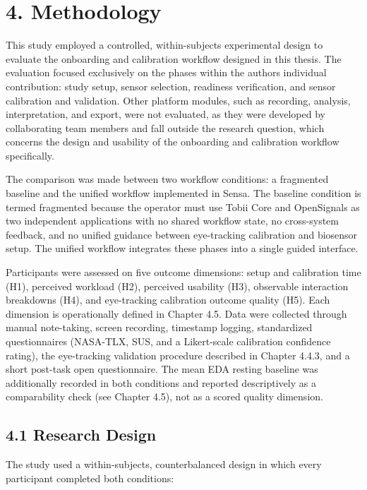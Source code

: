 \documentclass[
]{article}
\begin{document}
\clearpage
\hypertarget{methodology}{%
\section{4. Methodology}\label{methodology}}

This study employed a controlled, within-subjects experimental design to evaluate the onboarding and calibration workflow designed in this thesis. The evaluation focused exclusively on the phases within the author\textquotesingle s individual contribution: study setup, sensor selection, readiness verification, and sensor calibration and validation. Other platform modules, such as recording, analysis, interpretation, and export, were not evaluated, as they were developed by collaborating team members and fall outside the research question, which concerns the design and usability of the onboarding and calibration workflow specifically.

The comparison was made between two workflow conditions: a fragmented baseline and the unified workflow implemented in Sensa. The baseline condition is termed fragmented because the operator must use Tobii Core and OpenSignals as two independent applications with no shared workflow state, no cross-system feedback, and no unified guidance between eye-tracking calibration and biosensor setup. The unified workflow integrates these phases into a single guided interface.

Participants were assessed on five outcome dimensions: setup and calibration time (H1), perceived workload (H2), perceived usability (H3), observable interaction breakdowns (H4), and eye-tracking calibration outcome quality (H5). Each dimension is operationally defined in Chapter 4.5. Data were collected through manual note-taking, screen recording, timestamp logging, standardized questionnaires (NASA-TLX, SUS, and a Likert-scale calibration confidence rating), the eye-tracking validation procedure described in Chapter 4.4.3, and a short post-task open questionnaire. The mean EDA resting baseline was additionally recorded in both conditions and reported descriptively as a comparability check (see Chapter 4.5), not as a scored quality dimension.

\hypertarget{research-design}{%
\subsection{4.1 Research Design}\label{research-design}}

The study used a within-subjects, counterbalanced design in which every participant completed both conditions:
\end{document}
